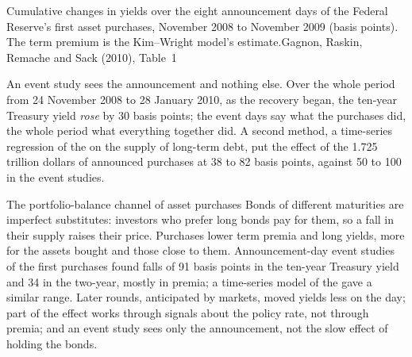 \begin{omchart}{Cumulative changes in yields over the eight announcement days of the
Federal Reserve's first asset purchases, November 2008 to November 2009 (basis
points). The term premium is the Kim--Wright model's estimate.}{Gagnon, Raskin,
Remache and Sack (2010), Table~1}
\end{omchart}

An event study sees the announcement and nothing else. Over the whole period from
24 November 2008 to 28 January 2010, as the recovery began, the ten-year Treasury
yield \emph{rose} by 30 basis points; the event days say what the purchases did,
the whole period what everything together did. %
A second method, a time-series regression of the  on the supply of
long-term debt, put the effect of the 1.725 trillion dollars of announced purchases
at 38 to 82 basis points, against 50 to 100 in the event studies. %

\begin{model}{The portfolio-balance channel of asset purchases}
\assumes Bonds of different maturities are imperfect substitutes: investors who
prefer long bonds pay for them, so a fall in their supply raises their price.
\predicts Purchases lower term premia and long yields, more for the assets bought
and those close to them.
\tested Announcement-day event studies of the first purchases found falls of 91
basis points in the ten-year Treasury yield and 34 in the two-year, mostly in
premia; a time-series model of the  gave a similar range.
\breaks Later rounds, anticipated by markets, moved yields less on the day; part of
the effect works through signals about the policy rate, not through premia; and an
event study sees only the announcement, not the slow effect of holding the bonds.
\end{model}

